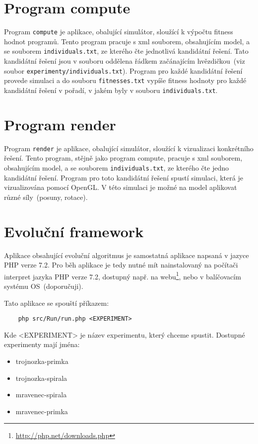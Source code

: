 \section{Program compute}
Program \texttt{compute} je aplikace, obalující simulátor, sloužící k výpočtu fitness hodnot programů.
Tento program pracuje s xml souborem, obsahujícím model, a se souborem \texttt{individuals.txt}, ze kterého čte jednotlivá kandidátní řešení.
Tato kandidátní řešení jsou v souboru oddělena řádkem začánajícím hvězdičkou~(viz soubor \texttt{experimenty/individuals.txt}).
Program pro každé kandidátní řešení provede simulaci a do souboru \texttt{fitnesses.txt} vypíše fitness hodnoty pro každé kandidátní řešení v pořadí, v jakém byly v souboru \texttt{individuals.txt}.

\section{Program render}
Program \texttt{render} je aplikace, obalující simulátor, sloužící k vizualizaci konkrétního řešení.
Tento program, stějně jako program compute, pracuje s xml souborem, obsahujícím model, a se souborem \texttt{individuals.txt}, ze kterého čte jedno kandidátní řešení.
Program pro toto kandidátní řešení spustí simulaci, která je vizualizována pomocí OpenGL\@.
V této simulaci je možné na model aplikovat různé síly~(posuny, rotace).


\section{Evoluční framework}
Aplikace obsahující evoluční algoritmus je samostatná aplikace napsaná v jazyce PHP verze 7.2.
Pro běh aplikace je tedy nutné mít nainstalovaný na počítači interpret jazyka PHP verze 7.2, dostupný např. na webu\footnote{\url{http://php.net/downloads.php}}, nebo v balíčovacím systému OS~(doporučuji).

Tato aplikace se spouští příkazem:
\begin{verbatim}
    php src/Run/run.php <EXPERIMENT>
\end{verbatim}

Kde <EXPERIMENT> je název experimentu, který chceme spustit.
Dostupné experimenty mají jména:
\begin{itemize}
    \item trojnozka-primka
    \item trojnozka-spirala
    \item mravenec-spirala
    \item mravenec-primka
\end{itemize}

